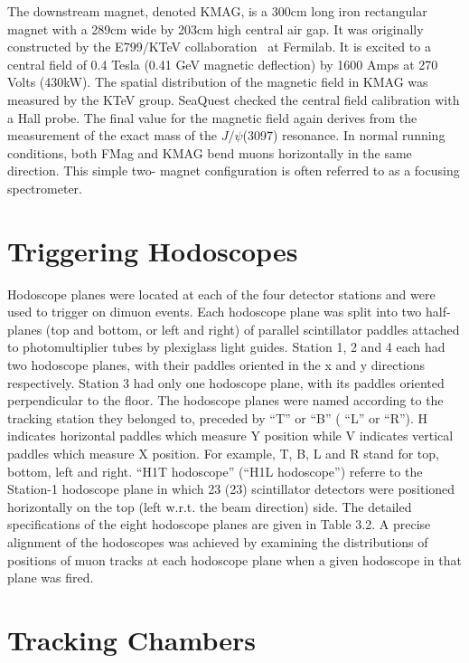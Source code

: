 The downstream magnet, denoted KMAG, is a 300cm long iron rectangular magnet with a 289cm wide by 203cm high central air gap.  It was originally constructed by the E799/KTeV collaboration~\cite{PhysRevD.67.012005} at Fermilab.  It is excited to a central field of 0.4 Tesla (0.41 GeV magnetic deflection) by 1600 Amps at 270 Volts (430kW).  The spatial distribution of the magnetic field in KMAG was measured by the KTeV group. SeaQuest checked the central field calibration with a Hall probe.  The final value for the magnetic field again derives from the measurement of the exact mass of the $J/\psi$(3097) resonance.   In normal running conditions, both FMag and KMAG bend muons horizontally in the same direction. This simple two- magnet configuration is often referred to as a focusing spectrometer.


\section{Triggering Hodoscopes}

Hodoscope planes were located at each of the four detector stations and were used
to trigger on dimuon events. Each hodoscope plane was split into two half-planes
(top and bottom, or left and right) of parallel scintillator paddles attached to photomultiplier tubes by plexiglass light guides. Station 1, 2 and 4 each had two hodoscope planes, with their paddles oriented in the x and y directions respectively.
Station 3 had only one hodoscope plane, with its paddles oriented perpendicular to
the floor. The hodoscope planes were named according to the tracking station they
belonged to, preceded by “T” or “B” ( “L” or “R”). H indicates horizontal paddles which measure Y position while V indicates vertical paddles which measure X
position. For example, T, B, L and R stand for top, bottom, left and right. “H1T
hodoscope” (“H1L hodoscope”) referre to the Station-1 hodoscope plane in which
23 (23) scintillator detectors were positioned horizontally on the top (left w.r.t. the
beam direction) side. The detailed specifications of the eight hodoscope planes are
given in Table 3.2. A precise alignment of the hodoscopes was achieved by examining the distributions of positions of muon tracks at each hodoscope plane when a
given hodoscope in that plane was fired.

\section{Tracking Chambers}

